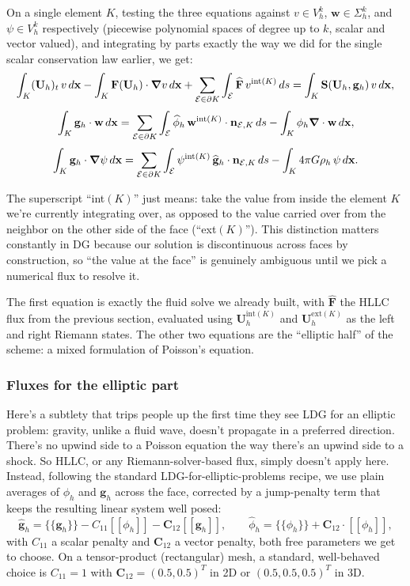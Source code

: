 On a single element $K$, testing the three equations against $v \in V_h^k$, $\mathbf{w} \in \Sigma_h^k$, and $\psi \in V_h^k$ respectively (piecewise polynomial spaces of degree up to $k$, scalar and vector valued), and integrating by parts exactly the way we did for the single scalar conservation law earlier, we get:
\[
	\int_K (\mathbf{U}_h)_t \, v \, d\mathbf{x} - \int_K \mathbf{F}(\mathbf{U}_h)\cdot\grad v \, d\mathbf{x} + \sum_{\mathcal{E}\in\partial K} \int_{\mathcal{E}} \widehat{\mathbf{F}}\, v^{\mathrm{int}(K)}\, ds = \int_K \mathbf{S}(\mathbf{U}_h,\mathbf{g}_h)\, v \, d\mathbf{x},
\]
\[
	\int_K \mathbf{g}_h \cdot \mathbf{w}\, d\mathbf{x} = \sum_{\mathcal{E}\in\partial K}\int_{\mathcal{E}} \widehat{\phi}_h \, \mathbf{w}^{\mathrm{int}(K)}\cdot\mathbf{n}_{\mathcal{E},K} \, ds - \int_K \phi_h \grad\cdot\mathbf{w}\, d\mathbf{x},
\]
\[
	\int_K \mathbf{g}_h \cdot \grad\psi\, d\mathbf{x} = \sum_{\mathcal{E}\in\partial K}\int_{\mathcal{E}} \psi^{\mathrm{int}(K)} \, \widehat{\mathbf{g}}_h\cdot\mathbf{n}_{\mathcal{E},K}\, ds - \int_K 4\pi G \rho_h \, \psi\, d\mathbf{x}.
\]

The superscript ``int$(K)$'' just means: take the value from inside the element $K$ we're currently integrating over, as opposed to the value carried over from the neighbor on the other side of the face (``ext$(K)$''). This distinction matters constantly in DG because our solution is discontinuous across faces by construction, so ``the value at the face'' is genuinely ambiguous until we pick a numerical flux to resolve it.

The first equation is exactly the fluid solve we already built, with $\widehat{\mathbf{F}}$ the HLLC flux from the previous section, evaluated using $\mathbf{U}_h^{\mathrm{int}(K)}$ and $\mathbf{U}_h^{\mathrm{ext}(K)}$ as the left and right Riemann states. The other two equations are the ``elliptic half'' of the scheme: a mixed formulation of Poisson's equation.

\subsubsection{Fluxes for the elliptic part}

Here's a subtlety that trips people up the first time they see LDG for an elliptic problem: gravity, unlike a fluid wave, doesn't propagate in a preferred direction. There's no upwind side to a Poisson equation the way there's an upwind side to a shock. So HLLC, or any Riemann-solver-based flux, simply doesn't apply here. Instead, following the standard LDG-for-elliptic-problems recipe, we use plain averages of $\phi_h$ and $\mathbf{g}_h$ across the face, corrected by a jump-penalty term that keeps the resulting linear system well posed:
\[
	\widehat{\mathbf{g}}_h = \{\!\{\mathbf{g}_h\}\!\} - C_{11}[\![\phi_h]\!] - \mathbf{C}_{12}[\![\mathbf{g}_h]\!], \qquad
	\widehat{\phi}_h = \{\!\{\phi_h\}\!\} + \mathbf{C}_{12}\cdot[\![\phi_h]\!],
\]
with $C_{11}$ a scalar penalty and $\mathbf{C}_{12}$ a vector penalty, both free parameters we get to choose. On a tensor-product (rectangular) mesh, a standard, well-behaved choice is $C_{11}=1$ with $\mathbf{C}_{12} = (0.5,0.5)^T$ in 2D or $(0.5,0.5,0.5)^T$ in 3D.

